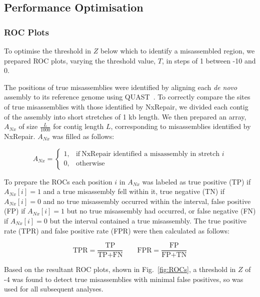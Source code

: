 \documentclass[fleqn,10pt]{wlpeerj}
\begin{document}
\subsection*{Performance Optimisation}
\subsubsection*{ROC Plots}
To optimise the threshold in $Z$ below which to identify a misassembled region, we prepared ROC plots, varying the threshold value, $T$, in steps of 1 between -10 and 0. 

The positions of true misassemblies were identified by aligning each \textit{de novo} assembly to its reference genome using QUAST~\citep{gurevich2013}. To correctly compare the sites of true misassemblies with those identified by NxRepair, we divided each contig of the assembly into short stretches of 1 kb length. We then prepared an array, $A_{Nx}$ of size $\frac{L}{1000}$ for contig length $L$, corresponding to misassemblies identified by NxRepair. $A_{Nx}$ was filled as follows:

\begin{equation}
    A_{Nx}=
    \begin{cases}
      1, & \text{if}\ \text{NxRepair identified a misassembly in stretch $i$} \\
      0, & \text{otherwise}
    \end{cases}
  \label{eq:found}
\end{equation}

To prepare the ROCs each position $i$ in $A_{Nx}$ was labeled as true positive (TP) if $A_{Nx}[i] = 1$ and a true misassembly fell within it, true negative (TN) if $A_{Nx}[i] = 0$ and no true misassembly occurred within the interval, false positive (FP) if $A_{Nx}[i] = 1$ but no true misassembly had occurred, or false negative (FN) if $A_{Nx}[i] = 0$ but the interval contained a true misassembly. The true positive rate (TPR) and false positive rate (FPR) were then calculated as follows:

\begin{equation}
\text{TPR} = \frac{\text{TP}}{\text{TP} + \text{FN}} \qquad \text{FPR} = \frac{\text{FP}}{\text{FP} + \text{TN}}
\label{eq:tpr}
\end{equation}

Based on the resultant ROC plots, shown in Fig.~\ref{fig:ROCs}, a threshold in $Z$ of -4 was found to detect true misassemblies with minimal false positives, so was used for all subsequent analyses. 
\end{document}
